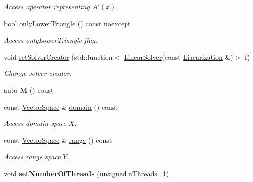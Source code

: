 \begin{DoxyCompactItemize}
\begin{DoxyCompactList}\small\item\em Access operator representing $A'(x)$. \end{DoxyCompactList}\item 
bool \hyperlink{classSpacy_1_1Kaskade_1_1DynamicC1Operator_a790124ad6b035750e819cdc0718e9af3}{only\+Lower\+Triangle} () const noexcept
\begin{DoxyCompactList}\small\item\em Access only\+Lower\+Triangle flag. \end{DoxyCompactList}\item 
void \hyperlink{classSpacy_1_1Kaskade_1_1DynamicC1Operator_a4a440be1a20133c2d7cb8c6382656172}{set\+Solver\+Creator} (std\+::function$<$ \hyperlink{namespaceSpacy_a4cd614ddb41dd29e68a723dadd5602f2}{Linear\+Solver}(const \hyperlink{classSpacy_1_1Kaskade_1_1LinearOperator}{Linearization} \&)$>$ f)
\begin{DoxyCompactList}\small\item\em Change solver creator. \end{DoxyCompactList}\item 
\hypertarget{classSpacy_1_1Kaskade_1_1DynamicC1Operator_a197de5e4e1bfbdd4759be55afcdb8090}{}auto {\bfseries M} () const \label{classSpacy_1_1Kaskade_1_1DynamicC1Operator_a197de5e4e1bfbdd4759be55afcdb8090}

\item 
\hypertarget{classSpacy_1_1OperatorBase_a2588f9b3e0188820c4c494e63293dc6f}{}const \hyperlink{classSpacy_1_1VectorSpace}{Vector\+Space} \& \hyperlink{classSpacy_1_1OperatorBase_a2588f9b3e0188820c4c494e63293dc6f}{domain} () const \label{classSpacy_1_1OperatorBase_a2588f9b3e0188820c4c494e63293dc6f}

\begin{DoxyCompactList}\small\item\em Access domain space $X$. \end{DoxyCompactList}\item 
\hypertarget{classSpacy_1_1OperatorBase_ab19d3b7a6f290b1079248f1e567e53d6}{}const \hyperlink{classSpacy_1_1VectorSpace}{Vector\+Space} \& \hyperlink{classSpacy_1_1OperatorBase_ab19d3b7a6f290b1079248f1e567e53d6}{range} () const \label{classSpacy_1_1OperatorBase_ab19d3b7a6f290b1079248f1e567e53d6}

\begin{DoxyCompactList}\small\item\em Access range space $Y$. \end{DoxyCompactList}\item 
\hypertarget{classSpacy_1_1Mixin_1_1NumberOfThreads_ab0c2fca77cb0d613e3bb8ce5bda11fdc}{}void {\bfseries set\+Number\+Of\+Threads} (unsigned \hyperlink{classSpacy_1_1Mixin_1_1NumberOfThreads_a385963b95b5e1ddf422393146cc71ee1}{n\+Threads}=1)\label{classSpacy_1_1Mixin_1_1NumberOfThreads_ab0c2fca77cb0d613e3bb8ce5bda11fdc}


\end{DoxyCompactItemize}
